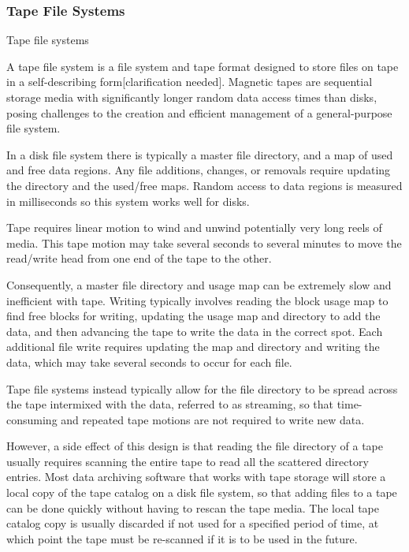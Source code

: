 \subsubsection{Tape File Systems}
\label{sssec:tape_file_systems}


Tape file systems



A tape file system is a file system and tape format designed to store files on
tape in a self-describing form[clarification needed]. Magnetic tapes are
sequential storage media with significantly longer random data access times than
disks, posing challenges to the creation and efficient management of a
general-purpose file system.



In a disk file system there is typically a master file directory, and a map of
used and free data regions. Any file additions, changes, or removals require
updating the directory and the used/free maps. Random access to data regions is
measured in milliseconds so this system works well for disks.



Tape requires linear motion to wind and unwind potentially very long reels of
media. This tape motion may take several seconds to several minutes to move the
read/write head from one end of the tape to the other.



Consequently, a master file directory and usage map can be extremely slow and
inefficient with tape. Writing typically involves reading the block usage map to
find free blocks for writing, updating the usage map and directory to add the
data, and then advancing the tape to write the data in the correct spot. Each
additional file write requires updating the map and directory and writing the
data, which may take several seconds to occur for each file.



Tape file systems instead typically allow for the file directory to be spread
across the tape intermixed with the data, referred to as streaming, so that
time-consuming and repeated tape motions are not required to write new data.



However, a side effect of this design is that reading the file directory of a
tape usually requires scanning the entire tape to read all the scattered
directory entries. Most data archiving software that works with tape storage
will store a local copy of the tape catalog on a disk file system, so that
adding files to a tape can be done quickly without having to rescan the tape
media. The local tape catalog copy is usually discarded if not used for a
specified period of time, at which point the tape must be re-scanned if it is to
be used in the future.



